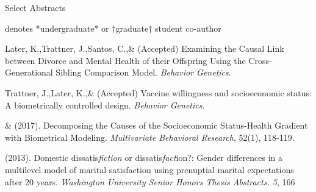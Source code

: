 \begin{rSection}{\textrm{Select Abstracts}}%
\vspace{-1mm}\begin{center}\footnotesize{denotes *undergraduate* or $\dagger$graduate$\dagger$ student co-author}\end{center}\vspace{-1mm}
%
\begin{etaremune}

\item Later, K.,\nota Trattner, J.,\nota Santos, C.,\notb \& \meb (Accepted) Examining the Causal Link between Divorce and Mental Health of their Offspring Using the Cross-Generational Sibling Comparison Model. \textit{Behavior Genetics}. 

\item Trattner, J.,\nota Later, K.,\nota \& \meb (Accepted) Vaccine willingness and socioeconomic status: A biometrically controlled design. \textit{Behavior Genetics}. 

\item\meb \& \joe (2017). Decomposing the Causes of the Socioeconomic Status-Health Gradient with Biometrical Modeling. \textit{Multivariate Behavioral Research}, 52(1), 118-119. 

\item\meb (2013). Domestic dissatis{\em fiction} or dissatis{\em fact}ion?: Gender differences in a multilevel model of marital satisfaction using prenuptial marital expectations after 20 years. {\em Washington University Senior Honors Thesis Abstracts. 5}, 166

\end{etaremune}
\end{rSection}